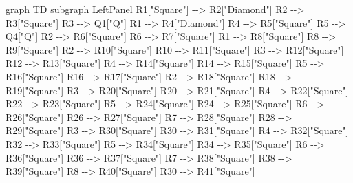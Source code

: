 \documentclass[
]{article}
\newenvironment{Shaded}{}{}
\newcommand{\NormalTok}[1]{#1}
\begin{document}
\begin{Shaded}
\begin{Highlighting}[]
\NormalTok{graph TD}
\NormalTok{    subgraph LeftPanel}
\NormalTok{        R1["Square"] {-}{-}\textgreater{} R2["Diamond"]}
\NormalTok{        R2 {-}{-}\textgreater{} R3["Square"]}
\NormalTok{        R3 {-}{-}\textgreater{} Q1["Q"]}
\NormalTok{        R1 {-}{-}\textgreater{} R4["Diamond"]}
\NormalTok{        R4 {-}{-}\textgreater{} R5["Square"]}
\NormalTok{        R5 {-}{-}\textgreater{} Q4["Q"]}
\NormalTok{        R2 {-}{-}\textgreater{} R6["Square"]}
\NormalTok{        R6 {-}{-}\textgreater{} R7["Square"]}
\NormalTok{        R1 {-}{-}\textgreater{} R8["Square"]}
\NormalTok{        R8 {-}{-}\textgreater{} R9["Square"]}
\NormalTok{        R2 {-}{-}\textgreater{} R10["Square"]}
\NormalTok{        R10 {-}{-}\textgreater{} R11["Square"]}
\NormalTok{        R3 {-}{-}\textgreater{} R12["Square"]}
\NormalTok{        R12 {-}{-}\textgreater{} R13["Square"]}
\NormalTok{        R4 {-}{-}\textgreater{} R14["Square"]}
\NormalTok{        R14 {-}{-}\textgreater{} R15["Square"]}
\NormalTok{        R5 {-}{-}\textgreater{} R16["Square"]}
\NormalTok{        R16 {-}{-}\textgreater{} R17["Square"]}
\NormalTok{        R2 {-}{-}\textgreater{} R18["Square"]}
\NormalTok{        R18 {-}{-}\textgreater{} R19["Square"]}
\NormalTok{        R3 {-}{-}\textgreater{} R20["Square"]}
\NormalTok{        R20 {-}{-}\textgreater{} R21["Square"]}
\NormalTok{        R4 {-}{-}\textgreater{} R22["Square"]}
\NormalTok{        R22 {-}{-}\textgreater{} R23["Square"]}
\NormalTok{        R5 {-}{-}\textgreater{} R24["Square"]}
\NormalTok{        R24 {-}{-}\textgreater{} R25["Square"]}
\NormalTok{        R6 {-}{-}\textgreater{} R26["Square"]}
\NormalTok{        R26 {-}{-}\textgreater{} R27["Square"]}
\NormalTok{        R7 {-}{-}\textgreater{} R28["Square"]}
\NormalTok{        R28 {-}{-}\textgreater{} R29["Square"]}
\NormalTok{        R3 {-}{-}\textgreater{} R30["Square"]}
\NormalTok{        R30 {-}{-}\textgreater{} R31["Square"]}
\NormalTok{        R4 {-}{-}\textgreater{} R32["Square"]}
\NormalTok{        R32 {-}{-}\textgreater{} R33["Square"]}
\NormalTok{        R5 {-}{-}\textgreater{} R34["Square"]}
\NormalTok{        R34 {-}{-}\textgreater{} R35["Square"]}
\NormalTok{        R6 {-}{-}\textgreater{} R36["Square"]}
\NormalTok{        R36 {-}{-}\textgreater{} R37["Square"]}
\NormalTok{        R7 {-}{-}\textgreater{} R38["Square"]}
\NormalTok{        R38 {-}{-}\textgreater{} R39["Square"]}
\NormalTok{        R8 {-}{-}\textgreater{} R40["Square"]}
\NormalTok{        R30 {-}{-}\textgreater{} R41["Square"]}

\end{Highlighting}
\end{Shaded}
\end{document}
